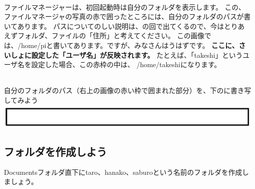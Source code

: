 \documentclass[a4paper,12pt]{jarticle}
\begin{document}
\\ファイルマネージャーは、初回起動時は自分のフォルダを表示します。
この、ファイルマネージャの写真の赤で囲ったところには、自分のフォルダのパスが書いてあります。
パスについてのしい説明は、の回で出てくるので、今はとりあえずフォルダ、ファイルの「住所」と考えてください。
この画像では、/home/piと書いてあります。ですが、みなさんはうはずです。
\textbf{\color{red}ここに、さいしょに設定した「ユーザ名」が反映されます。}
たとえば、「takeshi」というユーザ名を設定した場合、この赤枠の中は、
/home/takeshiになります。
\vspace{20pt}

\theQuestion\\
自分のフォルダのパス（右上の画像の赤い枠で囲まれた部分）を、下のに書き写してみよう
\includegraphics[width=17cm]{textbook-img1021.png}
\clearpage

\subsection{\theExercise フォルダを作成しよう}
Documentsフォルダ直下にtaro、hanako、saburoという名前のフォルダを作成しましょう。\\
\end{document}
